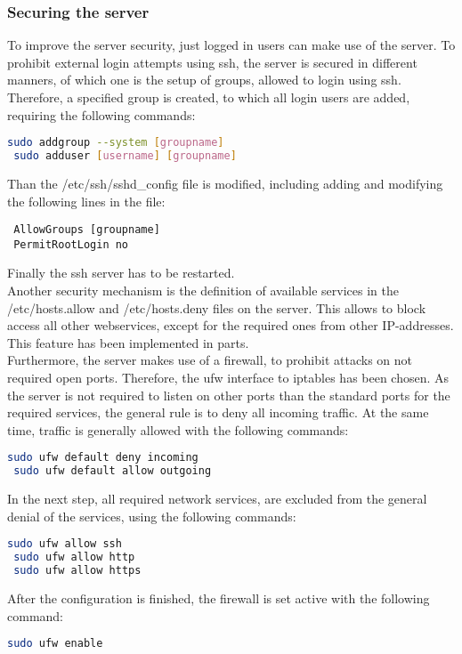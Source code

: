 \subsubsection{Securing the server}
To improve the server security, just logged in users can make use of the server. To prohibit external login attempts using ssh, the server is secured in different manners, of which 
one is the setup of groups, allowed to login using ssh. Therefore, a specified group is created, to which all login users are added, requiring the following commands:
\begin{lstlisting}[language=bash]
 sudo addgroup --system [groupname]
 sudo adduser [username] [groupname]
\end{lstlisting}
Than the /etc/ssh/sshd\_config file is modified, including adding and modifying the following lines in the file:
\begin{lstlisting}
 AllowGroups [groupname]
 PermitRootLogin no
\end{lstlisting}
Finally the ssh server has to be restarted.\\
Another security mechanism is the definition of available services in the /etc/hosts.allow and /etc/hosts.deny files on the server. This allows to block access all other webservices, 
except for the required ones from other IP-addresses. This feature has been implemented in parts.\\
Furthermore, the server makes use of a firewall, to prohibit attacks on not required open ports. Therefore, the ufw interface to iptables has been chosen. As the server is not 
required to listen on other ports than the standard ports for the required services, the general rule is to deny all incoming traffic. At the same time, traffic is generally 
allowed with the following commands:
\begin{lstlisting}[language=bash]
 sudo ufw default deny incoming
 sudo ufw default allow outgoing
\end{lstlisting}
In the next step, all required network services, are excluded from the general denial of the services, using the following commands:
\begin{lstlisting}[language=bash]
 sudo ufw allow ssh
 sudo ufw allow http
 sudo ufw allow https
\end{lstlisting}
After the configuration is finished, the firewall is set active with the following command:
\begin{lstlisting}[language=bash]
 sudo ufw enable
\end{lstlisting}


